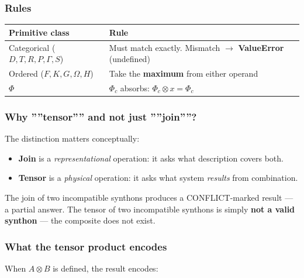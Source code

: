 \documentclass[12pt,a4paper]{article}
\begin{document}
\subsubsection{Rules}

\begin{table}[htbp]
\centering
\small
{}
\begin{tabularx}{\textwidth}{>{\centering\arraybackslash}X >{\centering\arraybackslash}X}
\toprule
\rowcolor{gray!25}\textbf{Primitive class} & \textbf{Rule} \\
\midrule
\rowcolors{1}{white}{gray!10}
Categorical ($D, T, R, P, \Gamma, S$) & Must match exactly. Mismatch $\rightarrow$ \textbf{ValueError} (undefined) \\
Ordered ($F, K, G, \Omega, H$) & Take the \textbf{maximum} from either operand \\
$\Phi$ & $\Phi_c$ absorbs: $\Phi_c \otimes x = \Phi_c$ \\
\bottomrule
\end{tabularx}
\end{table}

\subsubsection{Why ''''tensor'''' and not just ''''join''''?}

The distinction matters conceptually:

\begin{itemize}
    \item \textbf{Join} is a \emph{representational} operation: it asks what description covers both.
    \item \textbf{Tensor} is a \emph{physical} operation: it asks what system \emph{results} from combination.
\end{itemize}

The join of two incompatible synthons produces a CONFLICT-marked result --- a partial answer. The tensor of two incompatible synthons is simply \textbf{not a valid synthon} --- the composite does not exist.

\subsubsection{What the tensor product encodes}

When $A \otimes B$ is defined, the result encodes:
\end{document}
